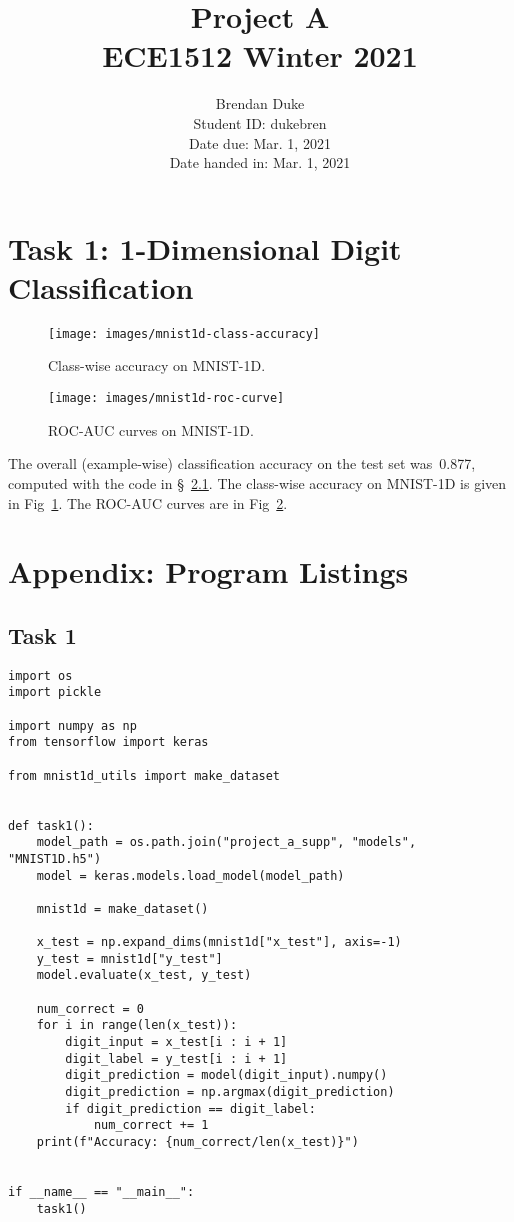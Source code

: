 \documentclass{article}
\title{Project A \\ECE1512 Winter 2021}
\author{Brendan Duke\\Student ID: dukebren\\Date due: Mar. 1, 2021\\Date handed in: Mar. 1, 2021}
\date{}
\begin{document}
\maketitle
\clearpage


\section{Task 1: 1-Dimensional Digit Classification}

\begin{figure}[t]
	\texttt{[image: images/mnist1d-class-accuracy]}
	\caption{\label{fig:mnist1d-classwise-accuracy}Class-wise accuracy on MNIST-1D\@.}
\end{figure}

\begin{figure}[t]
	\texttt{[image: images/mnist1d-roc-curve]}
	\caption{\label{fig:mnist1d-roc-curve}ROC-AUC curves on MNIST-1D\@.}
\end{figure}

The overall (example-wise) classification accuracy on the test set was~\num{0.877}, computed with the code in \S~\ref{sec:task1-listing}.
The class-wise accuracy on MNIST-1D is given in Fig~\ref{fig:mnist1d-classwise-accuracy}.
The ROC-AUC curves are in Fig~\ref{fig:mnist1d-roc-curve}.


\clearpage
\appendix
\section{Appendix: Program Listings}

\subsection{Task 1}
\label{sec:task1-listing}

\begin{lstlisting}
import os
import pickle

import numpy as np
from tensorflow import keras

from mnist1d_utils import make_dataset


def task1():
    model_path = os.path.join("project_a_supp", "models", "MNIST1D.h5")
    model = keras.models.load_model(model_path)

    mnist1d = make_dataset()

    x_test = np.expand_dims(mnist1d["x_test"], axis=-1)
    y_test = mnist1d["y_test"]
    model.evaluate(x_test, y_test)

    num_correct = 0
    for i in range(len(x_test)):
        digit_input = x_test[i : i + 1]
        digit_label = y_test[i : i + 1]
        digit_prediction = model(digit_input).numpy()
        digit_prediction = np.argmax(digit_prediction)
        if digit_prediction == digit_label:
            num_correct += 1
    print(f"Accuracy: {num_correct/len(x_test)}")


if __name__ == "__main__":
    task1()
\end{lstlisting}
\end{document}
